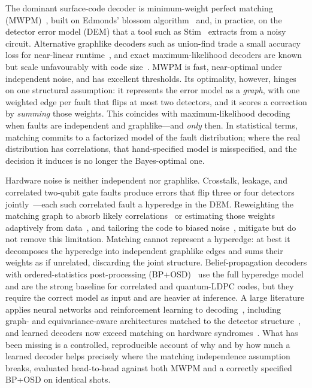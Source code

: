 \documentclass[aps,prxquantum,twocolumn,superscriptaddress,nofootinbib,longbibliography]{revtex4-2}
\begin{document}
The dominant surface-code decoder is minimum-weight perfect matching
(MWPM)~\cite{dennis2002topological,fowler2012surface,higgott2022pymatching,higgott2025sparse},
built on Edmonds' blossom algorithm~\cite{edmonds1965paths} and, in practice, on
the detector error model (DEM) that a tool such as Stim~\cite{gidney2021stim}
extracts from a noisy circuit. Alternative graphlike decoders such as union-find
trade a small accuracy loss for near-linear runtime~\cite{delfosse2021almost}, and
exact maximum-likelihood decoders are known but scale unfavourably with code
size~\cite{bravyi2014efficient,wootton2012high}. MWPM is fast, near-optimal under
independent noise, and has excellent thresholds. Its optimality, however, hinges on one structural
assumption: it represents the error model as a \emph{graph}, with one weighted
edge per fault that flips at most two detectors, and it scores a correction by
\emph{summing} those weights. This coincides with maximum-likelihood decoding
when faults are independent and graphlike---and \emph{only} then. In statistical
terms, matching commits to a factorized model of the fault distribution; where
the real distribution has correlations, that hand-specified model is
misspecified, and the decision it induces is no longer the Bayes-optimal one.

Hardware noise is neither independent nor graphlike. Crosstalk, leakage, and
correlated two-qubit gate faults produce errors that flip three or four detectors
jointly~\cite{google2023suppressing,bausch2024learning}---each such correlated
fault a hyperedge in the DEM. Reweighting the matching graph to absorb likely
correlations~\cite{fowler2013optimal} or estimating those weights adaptively from
data~\cite{spitz2018adaptive,nickerson2019analysing}, and tailoring the code to
biased noise~\cite{tuckett2018ultrahigh}, mitigate but do not remove this
limitation. Matching cannot represent a hyperedge: at best it
decomposes the hyperedge into independent graphlike edges and sums their weights
as if unrelated, discarding the joint structure. Belief-propagation decoders with
ordered-statistics post-processing (BP+OSD)~\cite{panteleev2021degenerate,roffe2020decoding}
use the full hyperedge model and are the strong baseline for correlated and
quantum-LDPC codes, but they require the correct model as input and are heavier at
inference. A large literature applies neural networks and reinforcement learning
to decoding~\cite{torlai2017neural,varsamopoulos2017decoding,baireuther2018machine,krastanov2017deep,sweke2020reinforcement,andreasson2019quantum,chamberland2018deep,varsamopoulos2020comparing,overwater2022neural},
including graph- and equivariance-aware architectures matched to the detector
structure~\cite{lange2025data,egorov2023end}, and learned decoders now exceed
matching on hardware syndromes~\cite{bausch2024learning}. What has been missing is a controlled,
reproducible account of why and by how much a learned decoder helps precisely
where the matching independence assumption breaks, evaluated head-to-head against
both MWPM and a correctly specified BP+OSD on identical shots.
\end{document}
